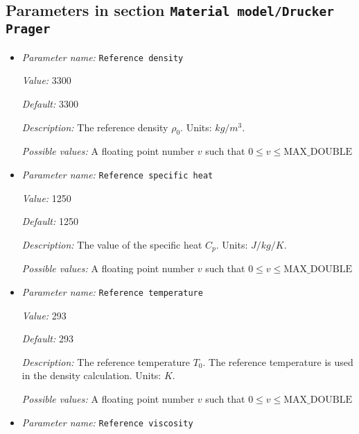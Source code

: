 \subsection{Parameters in section \tt Material model/Drucker Prager}
\label{parameters:Material_20model/Drucker_20Prager}

\begin{itemize}
\item {\it Parameter name:} {\tt Reference density}
\label{parameters:Material model/Drucker Prager/Reference density}


{\it Value:} 3300


{\it Default:} 3300


{\it Description:} The reference density $\rho_0$. Units: $kg/m^3$.


{\it Possible values:} A floating point number $v$ such that $0 \leq v \leq \text{MAX\_DOUBLE}$
\item {\it Parameter name:} {\tt Reference specific heat}
\label{parameters:Material model/Drucker Prager/Reference specific heat}


{\it Value:} 1250


{\it Default:} 1250


{\it Description:} The value of the specific heat $C_p$. Units: $J/kg/K$.


{\it Possible values:} A floating point number $v$ such that $0 \leq v \leq \text{MAX\_DOUBLE}$
\item {\it Parameter name:} {\tt Reference temperature}
\label{parameters:Material model/Drucker Prager/Reference temperature}


{\it Value:} 293


{\it Default:} 293


{\it Description:} The reference temperature $T_0$. The reference temperature is used in the density calculation. Units: $K$.


{\it Possible values:} A floating point number $v$ such that $0 \leq v \leq \text{MAX\_DOUBLE}$
\item {\it Parameter name:} {\tt Reference viscosity}
\label{parameters:Material model/Drucker Prager/Reference viscosity}



\end{itemize}
